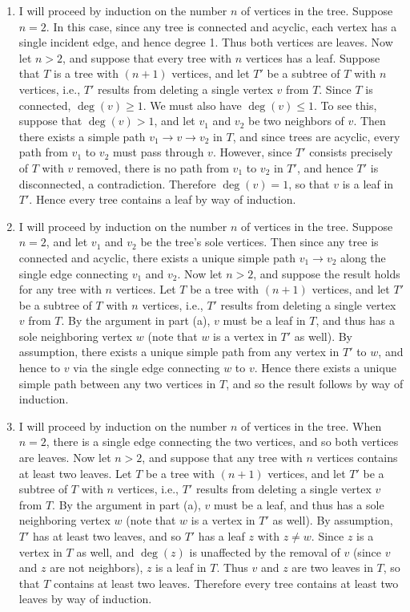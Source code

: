 \documentclass[12pt]{article}
\begin{document}
\begin{enumerate}[label=(\alph*)]
\item
I will proceed by induction on the number $n$ of vertices in the tree. Suppose $n = 2$. In this case, since any tree is connected and acyclic, each vertex has a single incident edge, and hence degree 1. Thus both vertices are leaves. Now let $n > 2$, and suppose that every tree with $n$ vertices has a leaf. Suppose that $T$ is a tree with $(n + 1)$ vertices, and let $T'$ be a subtree of $T$ with $n$ vertices, i.e., $T'$ results from deleting a single vertex $v$ from $T$. Since $T$ is connected, $\deg(v) \geq 1$. We must also have $\deg(v) \leq 1$. To see this, suppose that $\deg(v) > 1$, and let $v_1$ and $v_2$ be two neighbors of $v$. Then there exists a simple path $v_1 \to v \to v_2$ in $T$, and since trees are acyclic, every path from $v_1$ to $v_2$ must pass through $v$. However, since $T'$ consists precisely of $T$ with $v$ removed, there is no path from $v_1$ to $v_2$ in $T'$, and hence $T'$ is disconnected, a contradiction. Therefore $\deg(v) = 1$, so that $v$ is a leaf in $T'$. Hence every tree contains a leaf by way of induction.

\item
I will proceed by induction on the number $n$ of vertices in the tree. Suppose $n = 2$, and let $v_1$ and $v_2$ be the tree's sole vertices. Then since any tree is connected and acyclic, there exists a unique simple path $v_1 \to v_2$ along the single edge connecting $v_1$ and $v_2$. Now let $n > 2$, and suppose the result holds for any tree with $n$ vertices. Let $T$ be a tree with $(n + 1)$ vertices, and let $T'$ be a subtree of $T$ with $n$ vertices, i.e., $T'$ results from deleting a single vertex $v$ from $T$. By the argument in part (a), $v$ must be a leaf in $T$, and thus has a sole neighboring vertex $w$ (note that $w$ is a vertex in $T'$ as well). By assumption, there exists a unique simple path from any vertex in $T'$ to $w$, and hence to $v$ via the single edge connecting $w$ to $v$. Hence there exists a unique simple path between any two vertices in $T$, and so the result follows by way of induction.

\item
I will proceed by induction on the number $n$ of vertices in the tree. When $n = 2$, there is a single edge connecting the two vertices, and so both vertices are leaves. Now let $n > 2$, and suppose that any tree with $n$ vertices contains at least two leaves. Let $T$ be a tree with $(n + 1)$ vertices, and let $T'$ be a subtree of $T$ with $n$ vertices, i.e., $T'$ results from deleting a single vertex $v$ from $T$. By the argument in part (a), $v$ must be a leaf, and thus has a sole neighboring vertex $w$ (note that $w$ is a vertex in $T'$ as well). By assumption, $T'$ has at least two leaves, and so $T'$ has a leaf $z$ with $z \neq w$. Since $z$ is a vertex in $T$ as well, and $\deg(z)$ is unaffected by the removal of $v$ (since $v$ and $z$ are not neighbors), $z$ is a leaf in $T$. Thus $v$ and $z$ are two leaves in $T$, so that $T$ contains at least two leaves. Therefore every tree contains at least two leaves by way of induction.

\end{enumerate}
\end{document}
